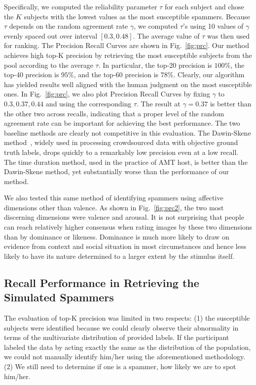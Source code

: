 \documentclass[10pt,journal,letterpaper,compsoc,twoside]{IEEEtran}
\begin{document}
Specifically, we computed the reliability parameter $\tau$ for each subject and chose the $K$ subjects with the lowest values as the most susceptible spammers. Because $\tau$ depends on the random agreement rate $\gamma$, we computed $\tau$'s using 10 values of $\gamma$ evenly spaced out over interval $[0.3, 0.48]$. The average value of $\tau$ was then used for ranking. The Precision Recall Curves
are shown in Fig.~\ref{fig:prc}.
Our method achieves high top-K precision by retrieving 
the most susceptible subjects from the pool according to the average $\tau$. In particular, the top-20 precision
is $100\%$, the top-40 precision is $95\%$, and the top-60 precision
is $78\%$. Clearly, our algorithm
has yielded results well aligned with the human judgment on the most susceptible ones. 
In Fig.~\ref{fig:prc}, we also plot Precision Recall Curves
by fixing $\gamma$ to $0.3,0.37,0.44$ and using the corresponding $\tau$. The result at $\gamma=0.37$
is better than the other two across recalls, indicating that a proper level of
the random agreement rate can be important for achieving the best performance.
{The two baseline methods are clearly not competitive in this evaluation.
The Dawin-Skene method~\cite{dawid1979maximum}, widely used in processing crowdsourced data with objective ground truth labels,
drops quickly to a remarkably low precision even at a low recall. The time duration method, used in the practice of AMT host,
is better than the Dawin-Skene method, yet substantially worse than the performance of our method.}

We also tested this same method of identifying spammers using affective dimensions other than valence. As shown in Fig.~\ref{fig:prc2}, the two most discerning dimensions were valence and arousal.
{It is not surprising that people can reach relatively higher consensus 
when rating images by these two dimensions than by dominance or likeness.
Dominance is much more likely to draw on evidence from context and social situation in most circumstances 
and hence less likely to have its nature determined to a larger extent by the stimulus itself.}

\subsection{Recall Performance in Retrieving the Simulated Spammers}
The evaluation of top-K precision was limited in two respects: (1) the susceptible 
subjects were identified because we could clearly observe their abnormality in terms of
the multivariate distribution of provided labels. 
If the participant labeled the data by acting exactly 
the same as the distribution of the population, we could not manually identify him/her 
using the aforementioned methodology. (2) We still need to determine
if one is a spammer, how likely we are to spot him/her. 
\end{document}
